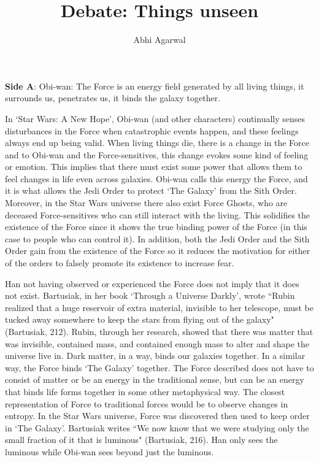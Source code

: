 \documentclass[11pt, oneside]{article}
\title{Debate: Things unseen\vspace{-0.4cm}}
\author{Abhi Agarwal\vspace{-1cm}}
\date{}
\begin{document}
\maketitle

\noindent \textbf{Side A}: Obi-wan: The Force is an energy field generated by all living things, it surrounds us, penetrates us, it binds the galaxy together.

\par In `Star Wars: A New Hope', Obi-wan (and other characters) continually senses disturbances in the Force when catastrophic events happen, and these feelings always end up being valid. When living things die, there is a change in the Force and to Obi-wan and the Force-sensitives, this change evokes some kind of feeling or emotion. This implies that there must exist some power that allows them to feel changes in life even across galaxies. Obi-wan calls this energy the Force, and it is what allows the Jedi Order to protect `The Galaxy' from the Sith Order. Moreover, in the Star Wars universe there also exist Force Ghosts, who are deceased Force-sensitives who can still interact with the living. This solidifies the existence of the Force since it shows the true binding power of the Force (in this case to people who can control it). In addition, both the Jedi Order and the Sith Order gain from the existence of the Force so it reduces the motivation for either of the orders to falsely promote its existence to increase fear.

\par Han not having observed or experienced the Force does not imply that it does not exist. Bartusiak, in her book `Through a Universe Darkly', wrote ``Rubin realized that a huge reservoir of extra material, invisible to her telescope, must be tucked away somewhere to keep the stars from flying out of the galaxy" (Bartusiak, 212). Rubin, through her research, showed that there was matter that was invisible, contained mass, and contained enough mass to alter and shape the universe live in. Dark matter, in a way, binds our galaxies together. In a similar way, the Force binds `The Galaxy' together. The Force described does not have to consist of matter or be an energy in the traditional sense, but can be an energy that binds life forms together in some other metaphysical way. The closest representation of Force to traditional forces would be to observe changes in entropy. In the Star Wars universe, Force was discovered then used to keep order in `The Galaxy'. Bartusiak writes ``We now know that we were studying only the small fraction of it that is luminous" (Bartusiak, 216). Han only sees the luminous while Obi-wan sees beyond just the luminous.
\end{document}
